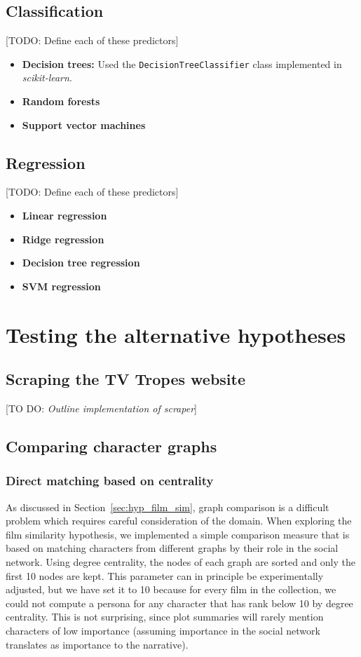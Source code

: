 \documentclass[bsc,frontabs,singlespacing,parskip, twoside]{infthesis}
\begin{document}
\subsection{Classification}
[TODO: Define each of these predictors]
\begin{itemize}
	\item \textbf{Decision trees:} Used the \texttt{DecisionTreeClassifier} class implemented in \textit{scikit-learn}.
	\item \textbf{Random forests}
	\item \textbf{Support vector machines}
\end{itemize}


\subsection{Regression}
[TODO: Define each of these predictors]
\begin{itemize}
	\item \textbf{Linear regression}
	\item \textbf{Ridge regression}
	\item \textbf{Decision tree regression}
	\item \textbf{SVM regression}
\end{itemize}

\section{Testing the alternative hypotheses}
\label{sec:alt_hyp_implementation}

\subsection{Scraping the TV Tropes website}
[TO DO: \textit{Outline implementation of scraper}]

\subsection{Comparing character graphs}
\label{sec:test_film_sim}

\subsubsection{Direct matching based on centrality}
As discussed in Section~\ref{sec:hyp_film_sim}, graph comparison is a difficult problem which requires careful consideration of the domain. When exploring the film similarity hypothesis, we implemented a simple comparison measure that is based on matching characters from different graphs by their role in the social network. Using degree centrality, the nodes of each graph are sorted and only the first 10 nodes are kept. This parameter can in principle be experimentally adjusted, but we have set it to 10 because for every film in the collection, we could not compute a persona for any character that has rank below 10 by degree centrality. This is not surprising, since plot summaries will rarely mention characters of low importance (assuming importance in the social network translates as importance to the narrative).
\end{document}
